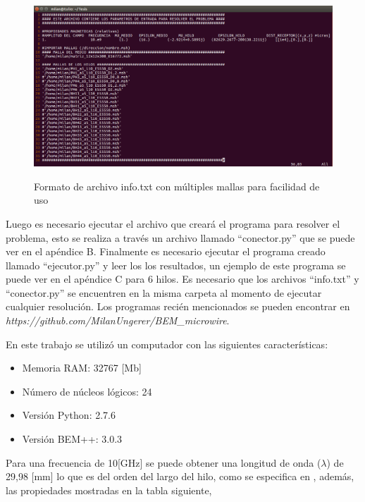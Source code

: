 \documentclass[12pt,letterpaper]{article}
\numberwithin{equation}{section}
\begin{document}
\begin{figure}[H]
	\centering\includegraphics[scale=0.42]{Imagenes/infotxt.png}\\
	\caption{Formato de archivo info.txt con múltiples mallas para facilidad de uso}
	\label{fig:infotxt}
\end{figure} 

\pagebreak
Luego es necesario ejecutar el archivo que creará el programa para resolver el problema, esto se realiza a través un archivo llamado ``conector.py'' que se puede ver en el apéndice B. Finalmente es necesario ejecutar el programa creado llamado ``ejecutor.py'' y leer los los resultados, un ejemplo de este programa se puede ver en el apéndice C para 6 hilos. Es necesario que los archivos ``info.txt'' y ``conector.py'' se encuentren en la misma carpeta al momento de ejecutar cualquier resolución. Los programas recién mencionados se pueden encontrar en \textit{https://github.com/MilanUngerer/BEM\_microwire}.

En este trabajo se utilizó un computador con las siguientes características:
\begin{itemize}
	\item Memoria RAM: 32767 [Mb]
	\item Número de núcleos lógicos: 24
	\item Versión Python: 2.7.6
	\item Versión BEM++: 3.0.3
\end{itemize}

Para una frecuencia de 10[GHz] se puede obtener una longitud de onda ($\lambda$) de 29,98 [mm] lo que es del orden del largo del hilo, como se especifica en \cite{Wire_theory_1,Wire_theory_2}, además, las propiedades mostradas en la tabla siguiente,\\
\end{document}
